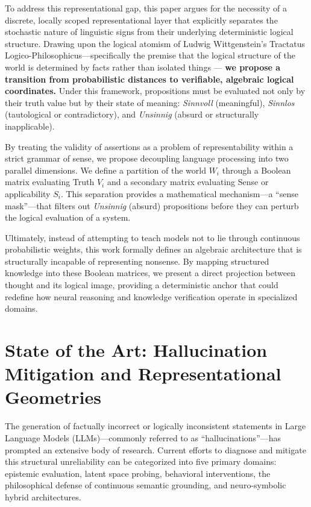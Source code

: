 \documentclass{article}
\begin{document}
To address this representational gap, this paper argues for the
necessity of a discrete, locally scoped representational layer that
explicitly separates the stochastic nature of linguistic signs from
their underlying deterministic logical structure. Drawing upon the
logical atomism of Ludwig Wittgenstein's Tractatus
Logico-Philosophicus---specifically the premise that the logical
structure of the world is determined by facts rather than isolated
things --- \textbf{we propose a transition from probabilistic distances
to verifiable, algebraic logical coordinates.} Under this framework,
propositions must be evaluated not only by their truth value but by
their state of meaning: \emph{Sinnvoll} (meaningful), \emph{Sinnlos}
(tautological or contradictory), and \emph{Unsinnig} (absurd or
structurally inapplicable).

By treating the validity of assertions as a problem of representability
within a strict grammar of sense, we propose decoupling language
processing into two parallel dimensions. We define a partition of the
world \(W_i\) through a Boolean matrix evaluating Truth \(V_i\) and a
secondary matrix evaluating Sense or applicability \(S_i\). This
separation provides a mathematical mechanism---a ``sense mask''---that
filters out \emph{Unsinnig} (absurd) propositions before they can
perturb the logical evaluation of a system.

Ultimately, instead of attempting to teach models not to lie through
continuous probabilistic weights, this work formally defines an
algebraic architecture that is structurally incapable of representing
nonsense. By mapping structured knowledge into these Boolean matrices,
we present a direct projection between thought and its logical image,
providing a deterministic anchor that could redefine how neural
reasoning and knowledge verification operate in specialized domains.

\hypertarget{state-of-the-art-hallucination-mitigation-and-representational-geometries}{%
\section{State of the Art: Hallucination Mitigation and Representational
Geometries}\label{state-of-the-art-hallucination-mitigation-and-representational-geometries}}

The generation of factually incorrect or logically inconsistent
statements in Large Language Models (LLMs)---commonly referred to as
``hallucinations''---has prompted an extensive body of research. Current
efforts to diagnose and mitigate this structural unreliability can be
categorized into five primary domains: epistemic evaluation, latent
space probing, behavioral interventions, the philosophical defense of
continuous semantic grounding, and neuro-symbolic hybrid architectures.
\end{document}

